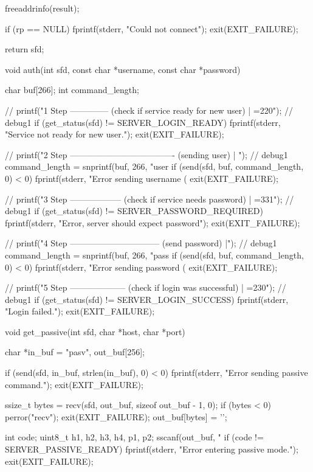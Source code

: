 \documentclass[11pt,a4paper,twocolumn]{article}
\begin{document}
\begin{c-darktheme}
{    freeaddrinfo(result);

    if (rp == NULL)
    {
        fprintf(stderr, "Could not connect\n");
        exit(EXIT_FAILURE);
    }

    return sfd;
}

void auth(int sfd, const char *username, const char *password)
{
    char buf[266];
    int command_length;

    // printf("1 Step -------------- (check if service ready for new user) | =220\n"); // debug1
    if (get_status(sfd) != SERVER_LOGIN_READY)
    {
        fprintf(stderr, "Service not ready for new user.\n");
        exit(EXIT_FAILURE);
    }

    // printf("2 Step ------------------------------------- (sending user) | \n"); // debug1
    command_length = snprintf(buf, 266, "user %
    if (send(sfd, buf, command_length, 0) < 0)
    {
        fprintf(stderr, "Error sending username (%
        exit(EXIT_FAILURE);
    }

    // printf("3 Step ------------------ (check if service needs password) | =331\n"); // debug1
    if (get_status(sfd) != SERVER_PASSWORD_REQUIRED)
    {
        fprintf(stderr, "Error, server should expect password\n");
        exit(EXIT_FAILURE);
    }

    // printf("4 Step -------------------------------- (send password) |\n"); // debug1
    command_length = snprintf(buf, 266, "pass %
    if (send(sfd, buf, command_length, 0) < 0)
    {
        fprintf(stderr, "Error sending password (%
        exit(EXIT_FAILURE);
    }

    // printf("5 Step -------------------- (check if login was successful) | =230\n"); // debug1
    if (get_status(sfd) != SERVER_LOGIN_SUCCESS)
    {
        fprintf(stderr, "Login failed.\n");
        exit(EXIT_FAILURE);
    }
}

void get_passive(int sfd, char *host, char *port)
{
    char *in_buf = "pasv\n", out_buf[256];

    if (send(sfd, in_buf, strlen(in_buf), 0) < 0)
    {
        fprintf(stderr, "Error sending passive command.\n");
        exit(EXIT_FAILURE);
    }

    ssize_t bytes = recv(sfd, out_buf, sizeof out_buf - 1, 0);
    if (bytes < 0)
    {
        perror("recv");
        exit(EXIT_FAILURE);
    }
    out_buf[bytes] = '\0';

    int code;
    uint8_t h1, h2, h3, h4, p1, p2;
    sscanf(out_buf, "%
    if (code != SERVER_PASSIVE_READY)
    {
        fprintf(stderr, "Error entering passive mode.\n");
        exit(EXIT_FAILURE);
    }

}
\end{c-darktheme}
\end{document}
